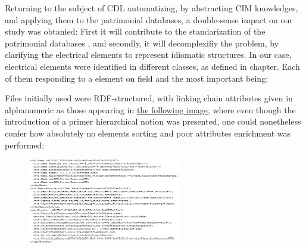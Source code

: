 Returning to the subject of CDL automatizing, by abstracting CIM knowledges, and applying them to the patrimonial databases, a double-sense impact on our study was obtanied: First it will contribute to the standarization of the patrimonial databases \cite{cahier_dpc2,guide_GAI,Note_accompagenement}, and secondly, it will decomplexifiy the problem, by clarifying the electrical elements to represent idiomatic structures. In our case, electrical elements were identified in different classes, as defined in  chapter. Each of them responding to a element on field and the most important being:

\begin{multicols}{3}
\end{multicols}


Files initially used were RDF-structured, with linking chain attributes given in alphanumeric as those appearing in \hyperref[fig:RDFformat]{the following image}, where even though the introduction of a primer hierarchical notion was presented, one could nonetheless confer how absolutely no elements sorting and poor attributes enrichment was performed:


\begin{figure}[h]
    \centering
    \parbox[t]{0.6\textwidth}{
    \href{}{\includegraphics[width=0.6\textwidth]{0.figuras/RDF_database_format.png}}
    \label{fig:RDFformat}}
\end{figure}

